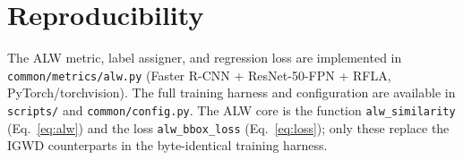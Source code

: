 \documentclass[journal]{IEEEtran}
\begin{document}
\section*{Reproducibility}

The ALW metric, label assigner, and regression loss are implemented in
\texttt{common/metrics/alw.py} (Faster R-CNN + ResNet-50-FPN + RFLA,
PyTorch/torchvision). The full training harness and configuration are available
in \texttt{scripts/} and \texttt{common/config.py}. The ALW core is the
function \texttt{alw\_similarity} (Eq.~\eqref{eq:alw}) and the loss
\texttt{alw\_bbox\_loss} (Eq.~\eqref{eq:loss}); only these replace the IGWD
counterparts in the byte-identical training harness.



\end{document}

